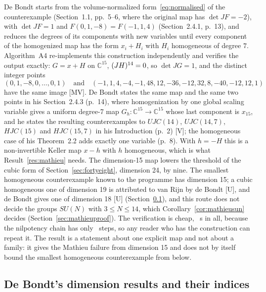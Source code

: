 \documentclass[11pt]{article}
\theoremstyle{remark}
\newcommand{\C}{\mathbb{C}}
\begin{document}
De Bondt \cite{deBondt2026} starts from the volume-normalized form~\eqref{eq:normalised} of the counterexample (Section~1.1, pp.~5--6, where the original map has $\det JF=-2$), with $\det JF = 1$ and $F(0,1,-8) = F(-1,1,4)$ (Section~2.4.1, p.~13), and reduces the degrees of its components with new variables until every component of the homogenized map has the form $x_i + H_i$ with $H_i$ homogeneous of degree $7$. Algorithm~A4 re-implements this construction independently and verifies the output exactly: $G = x + H$ on $\C^{15}$, $(JH)^{14} = 0$, so $\det JG = 1$, and the distinct integer points
\begin{equation}\label{eq:pts15}
(0,1,-8,0,\dots,0,1)\quad\text{and}\quad(-1,1,4,-4,-1,48,12,-36,-12,32,8,-40,-12,12,1)
\end{equation}
have the same image [MV]. De Bondt states the same map and the same two points in his Section~2.4.3 (p.~14), where homogenization by one global scaling variable gives a uniform degree-7 map $G_h:\C^{15}\to\C^{15}$ whose last component is $x_{15}$, and he states the resulting counterexamples to $UJC(14)$, $UJC(14,7)$, $HJC(15)$ and $HJC(15,7)$ in his Introduction (p.~2) [V]; the homogeneous case of his Theorem~2.2 adds exactly one variable (p.~8). With $h = -H$ this is a non-invertible Keller map $x - h$ with $h$ homogeneous, which is what Result~\ref{res:mathieu} needs. The dimension-15 map lowers the threshold of the cubic form of Section~\ref{sec:fortyeight}, dimension 24, by nine. The smallest homogeneous counterexample known to the programme has dimension 15; a cubic homogeneous one of dimension 19 is attributed to van Rijn by de Bondt \cite[pp.~3 and~37]{deBondt2026} [U], and de Bondt gives one of dimension 18 \cite[pp.~3 and~28]{deBondt2026} [U] (Section~\ref{sec:debondtdims}), and this route does not decide the groups $SU(N)$ with $3\le N\le14$, which Corollary~\ref{cor:mathieusun} decides (Section~\ref{sec:mathieuproof}). The verification is cheap, \nhomseconds\ s in all, because the nilpotency chain has only \nhomnil\ steps, so any reader who has the construction can repeat it. The result is a statement about one explicit map and not about a family: it gives the Mathieu failure from dimension 15 and does not by itself bound the smallest homogeneous counterexample from below.

\subsection{De Bondt's dimension results and their indices}\label{sec:debondtdims}
\end{document}
